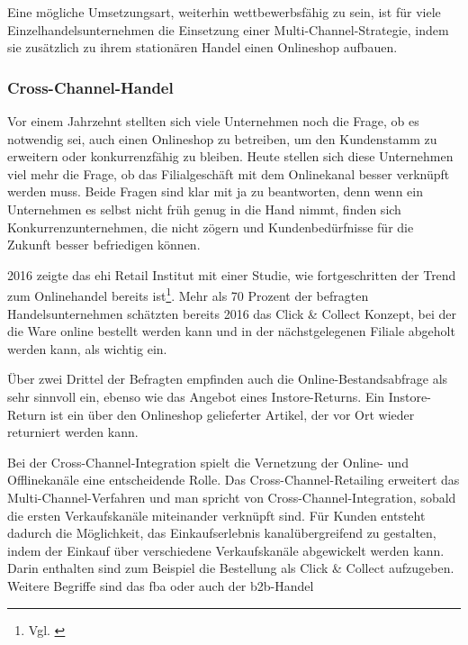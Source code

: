 Eine mögliche Umsetzungsart, weiterhin wettbewerbsfähig zu sein, ist für viele Einzelhandelsunternehmen die Einsetzung einer Multi-Channel-Strategie, indem sie zusätzlich zu ihrem stationären Handel einen Onlineshop aufbauen.


\subsubsection{Cross-Channel-Handel}\label{unterabschnitt_2_2_3}
Vor einem Jahrzehnt stellten sich viele Unternehmen noch die Frage, ob es notwendig sei, auch einen Onlineshop zu betreiben, um den Kundenstamm zu erweitern oder konkurrenzfähig zu bleiben. Heute stellen sich diese Unternehmen viel mehr die Frage, ob das Filialgeschäft mit dem Onlinekanal besser verknüpft werden muss. Beide Fragen sind klar mit ja zu beantworten, denn wenn ein Unternehmen es selbst nicht früh genug in die Hand nimmt, finden sich Konkurrenzunternehmen, die nicht zögern und Kundenbedürfnisse für die Zukunft besser befriedigen können.
\newline

2016 zeigte das \ac{ehi} Retail Institut mit einer Studie, wie fortgeschritten der Trend zum Onlinehandel bereits ist\footnote{Vgl. \autocite [S.17] {Hofacker2016}}.  Mehr als 70 Prozent der befragten Handelsunternehmen schätzten bereits 2016 das Click \& Collect Konzept, bei der die Ware online bestellt werden kann und in der nächstgelegenen Filiale abgeholt werden kann, als wichtig ein.
\newline

Über zwei Drittel der Befragten empfinden auch die Online-Bestandsabfrage als sehr sinnvoll ein, ebenso wie das Angebot eines Instore-Returns. Ein Instore-Return ist ein über den Onlineshop gelieferter Artikel, der vor Ort wieder returniert werden kann.
\newline

Bei der Cross-Channel-Integration spielt die Vernetzung der Online- und Offlinekanäle eine entscheidende Rolle.
\newline
Das Cross-Channel-Retailing erweitert das Multi-Channel-Verfahren und man spricht von Cross-Channel-Integration, sobald die ersten Verkaufskanäle miteinander verknüpft sind. Für Kunden entsteht dadurch die Möglichkeit, das Einkaufserlebnis kanalübergreifend zu gestalten, indem der Einkauf über verschiedene Verkaufskanäle abgewickelt werden kann. Darin enthalten sind zum Beispiel die Bestellung als Click \& Collect aufzugeben. Weitere Begriffe sind das \ac{fba} oder auch der \ac{b2b}-Handel
\newline


